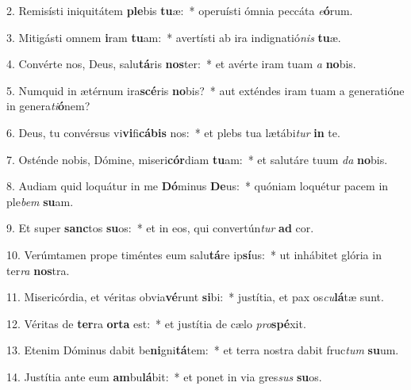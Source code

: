 2. Remisísti iniquitátem \textbf{ple}bis \textbf{tu}æ:~*  operuísti ómnia peccáta \textit{e}\textbf{ó}rum.\

3. Mitigásti omnem \textbf{i}ram \textbf{tu}am:~*  avertísti ab ira indignatió\textit{nis} \textbf{tu}æ.\

4. Convérte nos, Deus, salu\textbf{tá}ris \textbf{nos}ter:~*  et avérte iram tuam \textit{a} \textbf{no}bis.\

5. Numquid in ætérnum ira\textbf{scé}ris \textbf{no}bis?~*  aut exténdes iram tuam a generatióne in genera\textit{ti}\textbf{ó}nem?\

6. Deus, tu convérsus vi\textbf{vi}fi\textbf{cá}\textbf{bis} nos:~*  et plebs tua lætábi\textit{tur} \textbf{in} te.\

7. Osténde nobis, Dómine, miseri\textbf{cór}diam \textbf{tu}am:~*  et salutáre tuum \textit{da} \textbf{no}bis.\

8. Audiam quid loquátur in me \textbf{Dó}minus \textbf{De}us:~*  quóniam loquétur pacem in ple\textit{bem} \textbf{su}am.\

9. Et super \textbf{sanc}tos \textbf{su}os:~*  et in eos, qui convertún\textit{tur} \textbf{ad} cor.\

10. Verúmtamen prope timéntes eum salu\textbf{tá}re ip\textbf{sí}us:~*  ut inhábitet glória in ter\textit{ra} \textbf{nos}tra.\

11. Misericórdia, et véritas obvia\textbf{vé}runt \textbf{si}bi:~*  justítia, et pax os\textit{cu}\textbf{lá}tæ sunt.\

12. Véritas de \textbf{ter}ra \textbf{or}\textbf{ta} est:~*  et justítia de cælo \textit{pro}\textbf{spé}xit.\

13. Etenim Dóminus dabit be\textbf{ni}gni\textbf{tá}tem:~*  et terra nostra dabit fruc\textit{tum} \textbf{su}um.\

14. Justítia ante eum \textbf{am}bu\textbf{lá}bit:~*  et ponet in via gres\textit{sus} \textbf{su}os.\

